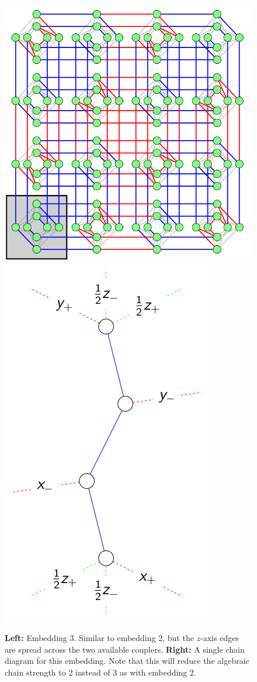\documentclass[11pt]{report}
\newcommand{\?}{\stackrel{?}{=}}
\begin{document}
\begin{figure}[h!]
  \centerline{\includegraphics[width=\linewidth/3]{resources/images/emb3.png}\hspace{1cm}\includegraphics[height=\linewidth/3]{resources/images/emb3_chain.png}}
  \caption{\textbf{Left:} Embedding 3. Similar to embedding 2, but the $z$-axis edges are spread across the two available couplers. \textbf{Right:} A single chain diagram for this embedding. Note that this will reduce the algebraic chain strength to 2 instead of 3 as with embedding 2.}
  \label{fig:boat1}
\end{figure}
\end{document}
